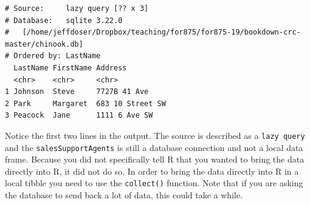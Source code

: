\documentclass[]{krantz}
\makeatletter
\newenvironment{Shaded}{\begin{snugshade}}{\end{snugshade}}
\newcommand{\KeywordTok}[1]{\textcolor[rgb]{0.27,0.27,0.27}{\textbf{#1}}}
\newcommand{\NormalTok}[1]{#1}
\newcommand{\OperatorTok}[1]{\textcolor[rgb]{0.43,0.43,0.43}{\textbf{#1}}}
\newcommand{\StringTok}[1]{\textcolor[rgb]{0.5,0.5,0.5}{#1}}
\newenvironment{kframe}{%
\medskip{}
\setlength{\fboxsep}{.8em}
 \def\at@end@of@kframe{}%
 \ifinner\ifhmode%
  \def\at@end@of@kframe{\end{minipage}}%
  \begin{minipage}{\columnwidth}%
 \fi\fi%
 \def\FrameCommand##1{\hskip\@totalleftmargin \hskip-\fboxsep
 \colorbox{shadecolor}{##1}\hskip-\fboxsep
     \hskip-\linewidth \hskip-\@totalleftmargin \hskip\columnwidth}%
 \MakeFramed {\advance\hsize-\width
   \@totalleftmargin\z@ \linewidth\hsize
   \@setminipage}}%
 {\par\unskip\endMakeFramed%
 \at@end@of@kframe}
\renewenvironment{Shaded}{\begin{kframe}}{\end{kframe}}
\makeatother
\begin{document}
\begin{Shaded}
\end{Shaded}

\begin{verbatim}
# Source:     lazy query [?? x 3]
# Database:   sqlite 3.22.0
#   [/home/jeffdoser/Dropbox/teaching/for875/for875-19/bookdown-crc-master/chinook.db]
# Ordered by: LastName
  LastName FirstName Address         
  <chr>    <chr>     <chr>           
1 Johnson  Steve     7727B 41 Ave    
2 Park     Margaret  683 10 Street SW
3 Peacock  Jane      1111 6 Ave SW   
\end{verbatim}

Notice the first two lines in the output. The source is described as a \texttt{lazy\ query} and the \texttt{salesSupportAgents} is still a database connection and not a local data frame. Because you did not specifically tell R that you wanted to bring the data directly into R, it did not do so. In order to bring the data directly into R in a local tibble you need to use the \texttt{collect()} function. Note that if you are asking the database to send back a lot of data, this could take a while.

\begin{Shaded}
\end{Shaded}
\end{document}
